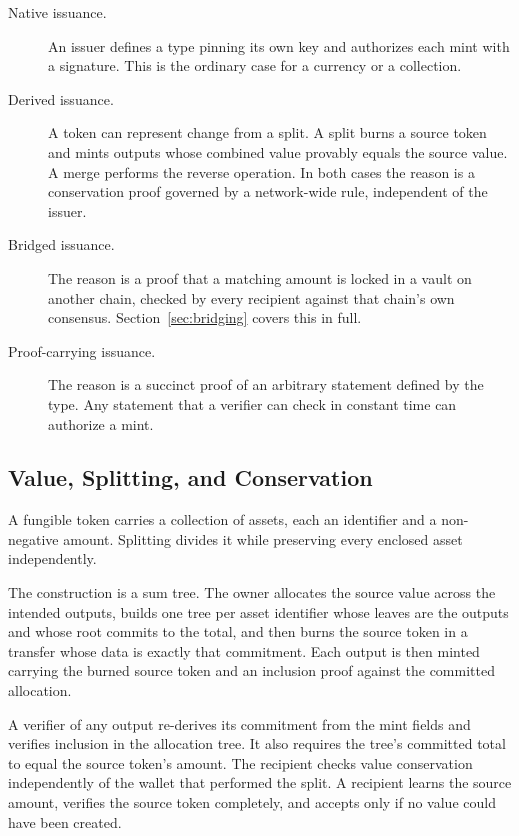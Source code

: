 \begin{description}
    \item[Native issuance.] An issuer defines a type pinning its own key and authorizes each mint with a signature. This is the ordinary case for a currency or a collection.

    \item[Derived issuance.] A token can represent change from a split. A split burns a source token and mints outputs whose combined value provably equals the source value. A merge performs the reverse operation. In both cases the reason is a conservation proof governed by a network-wide rule, independent of the issuer.

    \item[Bridged issuance.] The reason is a proof that a matching amount is locked in a vault on another chain, checked by every recipient against that chain's own consensus. Section~\ref{sec:bridging} covers this in full.

    \item[Proof-carrying issuance.] The reason is a succinct proof of an arbitrary statement defined by the type. Any statement that a verifier can check in constant time can authorize a mint.
\end{description}

\subsection{Value, Splitting, and Conservation}

A fungible token carries a collection of assets, each an identifier and a non-negative amount. Splitting divides it while preserving every enclosed asset independently.

The construction is a sum tree. The owner allocates the source value across the intended outputs, builds one tree per asset identifier whose leaves are the outputs and whose root commits to the total, and then burns the source token in a transfer whose data is exactly that commitment. Each output is then minted carrying the burned source token and an inclusion proof against the committed allocation.

A verifier of any output re-derives its commitment from the mint fields and verifies inclusion in the allocation tree. It also requires the tree's committed total to equal the source token's amount. The recipient checks value conservation independently of the wallet that performed the split. A recipient learns the source amount, verifies the source token completely, and accepts only if no value could have been created.

